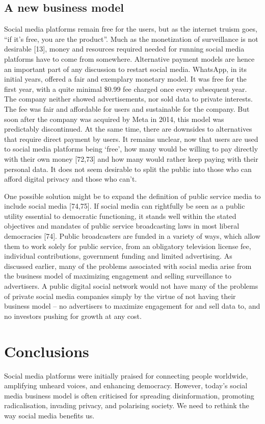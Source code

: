 \documentclass{sistedes}
\begin{document}
\subsection{A new business model}
Social media platforms remain free for the users, but as the internet truism goes, “if it’s free, you are the product”. Much as the monetization of surveillance is not desirable [13], money and resources required needed for running social media platforms have to come from somewhere. Alternative payment models are hence an important part of any discussion to restart social media. WhatsApp, in its initial years, offered a fair and exemplary monetary model. It was free for the first year, with a quite minimal \$0.99 fee charged once every subsequent year. The company neither showed advertisements, nor sold data to private interests. The fee was fair and affordable for users and sustainable for the company. But soon after the company was acquired by Meta in 2014, this model was predictably discontinued. At the same time, there are downsides to alternatives that require direct payment by users. It remains unclear, now that users are used to social media platforms being ‘free’, how many would be willing to pay directly with their own money [72,73] and how many would rather keep paying with their personal data. It does not seem desirable to split the public into those who can afford digital privacy and those who can’t.

One possible solution might be to expand the definition of public service media to include social media [74,75]. If social media can rightfully be seen as a public utility essential to democratic functioning, it stands well within the stated objectives and mandates of public service broadcasting laws in most liberal democracies [74]. Public broadcasters are funded in a variety of ways, which allow them to work solely for public service, from an obligatory television license fee, individual contributions, government funding and limited advertising. As discussed earlier, many of the problems associated with social media arise from the business model of maximizing engagement and selling surveillance to advertisers. A public digital social network would not have many of the problems of private social media companies simply by the virtue of not having their business model – no advertisers to maximize engagement for and sell data to, and no investors pushing for growth at any cost.

\section{Conclusions}
Social media platforms were initially praised for connecting people worldwide, amplifying unheard voices, and enhancing democracy. However, today's social media business model is often criticised for spreading disinformation, promoting radicalisation, invading privacy, and polarising society. We need to rethink the way social media benefits us.
\end{document}
